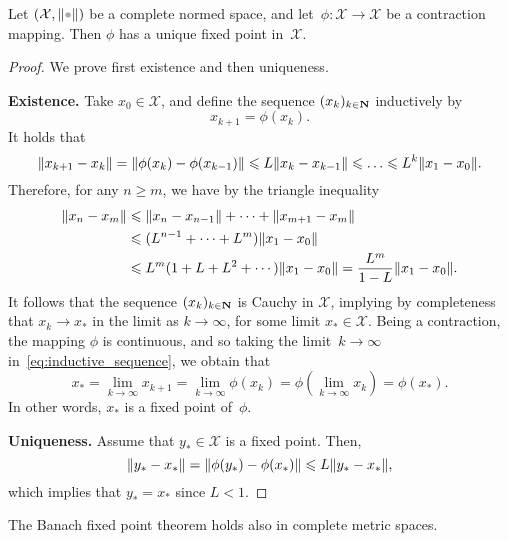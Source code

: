 \begin{theorem}
    \label{theorem:banach_fixed_point}
    Let $(\mathcal X, \norm{\placeholder})$ be a complete normed space,
    and let~$\phi\colon \mathcal X \to \mathcal X$ be a contraction mapping.
    Then $\phi$ has a unique fixed point in~$\mathcal X$.
\end{theorem}
\begin{proof}
    We prove first existence and then uniqueness.

    \noindent\textbf{Existence.}
    Take $x_0 \in \mathcal X$,
    and define the sequence $(x_k)_{k\in \mathbf N}$ inductively by
    \begin{equation}
        \label{eq:inductive_sequence}
        x_{k+1} = \phi(x_k).
    \end{equation}
    It holds that
    \[
        \norm[big]{x_{k+1} - x_{k}}
        = \norm[big]{\phi(x_{k}) - \phi(x_{k-1})}
        \leq L\norm{x_{k} - x_{k-1}}
        \leq \dots \leq L^{k} \norm{x_{1} - x_0}.
    \]
    Therefore, for any $n \geq m$,
    we have by the triangle inequality
    \begin{align*}
        \lVert x_{n} - x_{m}\rVert
        &\leqslant \lVert x_{n} - x_{n-1}\rVert + \dotsb + \lVert x_{m+1} - x_{m}\rVert \\
        &\leqslant (L^{n-1} + \dotsb + L^{m}) \lVert x_{1} - x_0\rVert \\
        &\leqslant L^{m} (1 + L + L^2 + \dotsb) \lVert x_{1} - x_0\rVert
        = \frac{L^{m}}{1-L} \lVert x_{1} - x_0\rVert.
    \end{align*}
    It follows that the sequence $(x_k)_{k\in \mathbf N}$ is Cauchy in $\mathcal X$,
    implying by completeness that $x_k \to x_*$ in the limit as $k \to \infty$,
    for some limit $x_* \in \mathcal X$.
    Being a contraction, the mapping $\phi$ is continuous,
    and so taking the limit~$k \to \infty$ in~\eqref{eq:inductive_sequence}, we obtain that
    \[
        x_* = \lim_{k \to \infty} x_{k+1}
        = \lim_{k \to \infty} \phi(x_k)
        = \phi \left( \lim_{k \to \infty} x_k \right)
        = \phi(x_*).
    \]
    In other words, $x_*$ is a fixed point of~$\phi$.

    \vspace{.2cm}
    \noindent\textbf{Uniqueness.}
    Assume that $y_* \in \mathcal X$ is a fixed point.
    Then,
    \begin{equation*}
        \norm[big]{y_* - x_{*}}
        = \norm[big]{\phi(y_*) - \phi(x_{*})}
        \leq L \norm{y_* - x_*},
    \end{equation*}
    which implies that $y_* = x_*$ since $L < 1$.
\end{proof}
\begin{remark}
    The Banach fixed point theorem holds also in complete metric spaces.
\end{remark}

